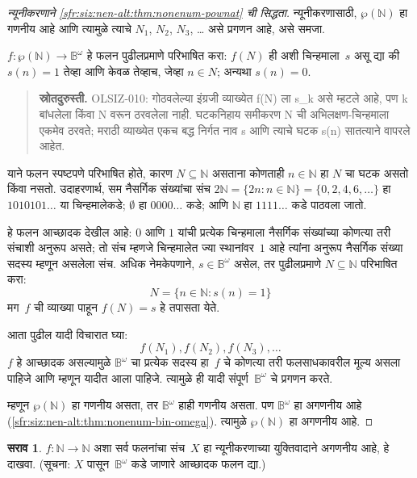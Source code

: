 \documentclass[11pt,a4paper,openany]{book}
\theoremstyle{definition}
\newtheorem{prob}{सराव}[chapter]
\newcommand{\Setabs}[2]{\{#1:#2\}}
\newcommand{\Pow}[1]{\wp(#1)}
\newcommand{\Nat}{\mathbb{N}}
\newcommand{\Bin}{\mathbb{B}}
\begin{document}
\begin{proof}[न्यूनीकरणाने {\ref{sfr:siz:nen-alt:thm:nonenum-pownat}} ची सिद्धता]
न्यूनीकरणासाठी, $\Pow{\Nat}$ हा गणनीय आहे आणि त्यामुळे त्याचे
$N_{1}$, $N_{2}$, $N_{3}$, \dots{} असे प्रगणन आहे, असे समजा.

$f \colon \Pow{\Nat} \to \Bin^\omega$ हे फलन पुढीलप्रमाणे परिभाषित
करा: $f(N)$ ही अशी चिन्हमाला~$s$ असू द्या की $s(n) = 1$ तेव्हा आणि
केवळ तेव्हाच, जेव्हा $n \in N$; अन्यथा $s(n) = 0$.
\begin{quote}\small\textbf{स्रोतदुरुस्ती.} OLSIZ-010: गोठवलेल्या इंग्रजी व्याख्येत f(N) ला s\_k असे म्हटले आहे, पण k बांधलेला किंवा N वरून ठरवलेला नाही. घटकनिहाय समीकरण N ची अभिलक्षण-चिन्हमाला एकमेव ठरवते; मराठी व्याख्येत एकच बद्ध निर्गत नाव s आणि त्याचे घटक s(n) सातत्याने वापरले आहेत.\end{quote}

याने फलन स्पष्टपणे परिभाषित होते, कारण $N \subseteq \Nat$ असताना
कोणताही $n \in \Nat$ हा $N$ चा घटक असतो किंवा नसतो.
उदाहरणार्थ, सम नैसर्गिक संख्यांचा संच
$2\Nat = \Setabs{2n}{n \in \Nat} = \{0,2, 4, 6, \dots\}$ हा
$1010101\dots$ या चिन्हमालेकडे; $\emptyset$ हा $0000\dots$ कडे; आणि
$\Nat$ हा $1111\dots$ कडे पाठवला जातो.

हे फलन आच्छादक देखील आहे: $0$ आणि $1$ यांची प्रत्येक चिन्हमाला
नैसर्गिक संख्यांच्या कोणत्या तरी संचाशी अनुरूप असते; तो संच म्हणजे
चिन्हमालेत ज्या स्थानांवर~$1$ आहे त्यांना अनुरूप नैसर्गिक संख्या
सदस्य म्हणून असलेला संच. अधिक नेमकेपणाने, $s \in \Bin^\omega$ असेल,
तर पुढीलप्रमाणे $N \subseteq \Nat$ परिभाषित करा:
\[
N = \Setabs{n \in \Nat}{s(n) = 1}
\]
मग~$f$ ची व्याख्या पाहून $f(N) = s$ हे तपासता येते.

आता पुढील यादी विचारात घ्या:
\[
f(N_1), f(N_2), f(N_3), \dots
\]
$f$ हे आच्छादक असल्यामुळे $\Bin^\omega$ चा प्रत्येक सदस्य
हा~$f$ चे कोणत्या तरी फलसाधकावरील मूल्य असला पाहिजे आणि म्हणून यादीत
आला पाहिजे. त्यामुळे ही यादी संपूर्ण~$\Bin^\omega$ चे प्रगणन करते.

म्हणून $\Pow{\Nat}$ हा गणनीय असता, तर $\Bin^\omega$ हाही
गणनीय असता. पण $\Bin^\omega$ हा अगणनीय आहे
(\ref{sfr:siz:nen-alt:thm:nonenum-bin-omega}). त्यामुळे $\Pow{\Nat}$ हा
अगणनीय आहे.
\end{proof}


\begin{prob}\label{sfr:siz:red:prob:nat-nat}
  $f\colon \Nat \to \Nat$ अशा सर्व फलनांचा संच~$X$ हा
  न्यूनीकरणाच्या युक्तिवादाने अगणनीय आहे, हे दाखवा.
  (सूचना: $X$ पासून~$\Bin^\omega$ कडे जाणारे आच्छादक फलन द्या.)
\end{prob}
\end{document}
